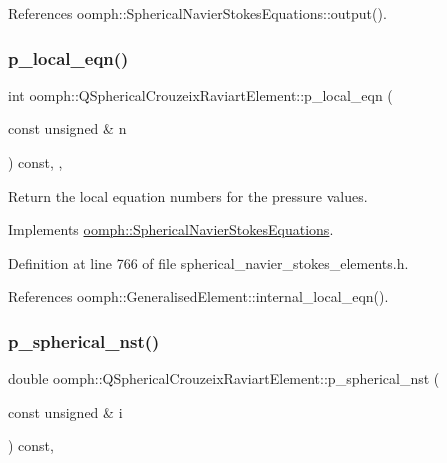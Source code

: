 References oomph\+::\+Spherical\+Navier\+Stokes\+Equations\+::output().

\mbox{\label{classoomph_1_1QSphericalCrouzeixRaviartElement_a5a4508bfabe7a630fd6c685ccc59870b}} 
\subsubsection{\texorpdfstring{p\+\_\+local\+\_\+eqn()}{p\_local\_eqn()}}
{\footnotesize\ttfamily int oomph\+::\+Q\+Spherical\+Crouzeix\+Raviart\+Element\+::p\+\_\+local\+\_\+eqn (\begin{DoxyParamCaption}\item[{const unsigned \&}]{n }\end{DoxyParamCaption}) const\hspace{0.3cm}{\ttfamily [inline]}, {\ttfamily [protected]}, {\ttfamily [virtual]}}



Return the local equation numbers for the pressure values. 



Implements \hyperlink{classoomph_1_1SphericalNavierStokesEquations_ad8d9a0edbe3793a008a6bff670c26643}{oomph\+::\+Spherical\+Navier\+Stokes\+Equations}.



Definition at line 766 of file spherical\+\_\+navier\+\_\+stokes\+\_\+elements.\+h.



References oomph\+::\+Generalised\+Element\+::internal\+\_\+local\+\_\+eqn().

\mbox{\label{classoomph_1_1QSphericalCrouzeixRaviartElement_a793d90652542ffffade39aaf25f9cc4c}} 
\subsubsection{\texorpdfstring{p\+\_\+spherical\+\_\+nst()}{p\_spherical\_nst()}}
{\footnotesize\ttfamily double oomph\+::\+Q\+Spherical\+Crouzeix\+Raviart\+Element\+::p\+\_\+spherical\+\_\+nst (\begin{DoxyParamCaption}\item[{const unsigned \&}]{i }\end{DoxyParamCaption}) const\hspace{0.3cm}{\ttfamily [inline]}, {\ttfamily [virtual]}}



